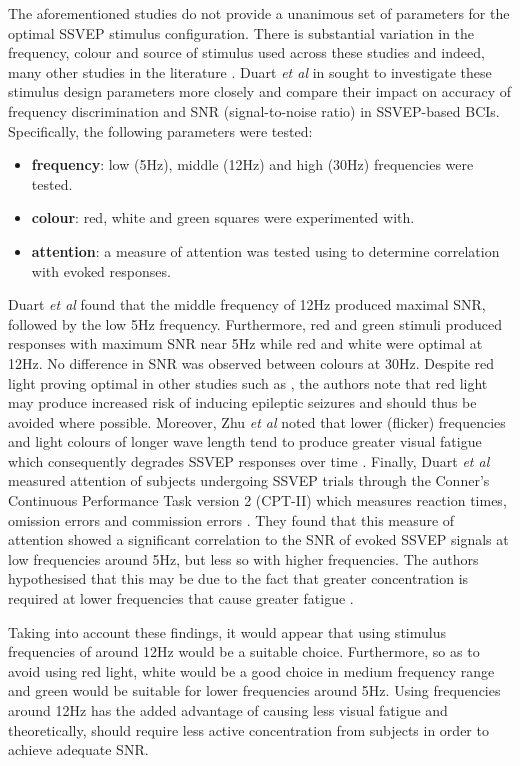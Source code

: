 The aforementioned studies do not provide a unanimous set of parameters for the optimal SSVEP stimulus configuration. There is substantial variation in the frequency, colour and source of stimulus used across these studies and indeed, many other studies in the literature \cite{duart-comparing-ssvep-stimuli}. Duart \textit{et al} in \cite{duart-comparing-ssvep-stimuli} sought to investigate these stimulus design parameters more closely and compare their impact on accuracy of frequency discrimination and SNR (signal-to-noise ratio) in SSVEP-based BCIs. Specifically, the following parameters were tested:
\begin{itemize}
    \item \textbf{frequency}: low (5Hz), middle (12Hz) and high (30Hz) frequencies were tested.
    \item \textbf{colour}: red, white and green squares were experimented with. 
    \item \textbf{attention}: a measure of attention was tested using to determine correlation with evoked responses.
\end{itemize}
Duart \textit{et al} found that the middle frequency of 12Hz produced maximal SNR, followed by the low 5Hz frequency. Furthermore, red and green stimuli produced responses with maximum SNR near 5Hz while red and white were optimal at 12Hz. No difference in SNR was observed between colours at 30Hz. Despite red light proving optimal in other studies such as \cite{chu-ssvep-colours}, the authors note that red light may produce increased risk of inducing epileptic seizures and should thus be avoided where possible. Moreover, Zhu \textit{et al} noted that lower (flicker) frequencies and light colours of longer wave length tend to produce greater visual fatigue which consequently degrades SSVEP responses over time \cite{zhu2010survey}. Finally, Duart \textit{et al} measured attention of subjects undergoing SSVEP trials through the Conner's Continuous Performance Task version 2 (CPT-II) which measures reaction times, omission errors and commission errors \cite{duart-comparing-ssvep-stimuli}. They found that this measure of attention showed a significant correlation to the SNR of evoked SSVEP signals at low frequencies around 5Hz, but less so with higher frequencies. The authors hypothesised that this may be due to the fact that greater concentration is required at lower frequencies that cause greater fatigue \cite{duart-comparing-ssvep-stimuli}.

Taking into account these findings, it would appear that using stimulus frequencies of around 12Hz would be a suitable choice. Furthermore, so as to avoid using red light, white would be a good choice in medium frequency range and green would be suitable for lower frequencies around 5Hz. Using frequencies around 12Hz has the added advantage of causing less visual fatigue and theoretically, should require less active concentration from subjects in order to achieve adequate SNR.

